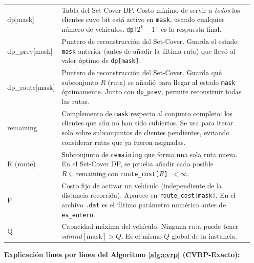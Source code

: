\documentclass[12pt,a4paper]{article}
\begin{document}
\begin{center}
\begin{tabular}{>{\ttfamily}lp{10cm}}
\addlinespace
dp[mask] & Tabla del Set-Cover DP. Costo mínimo de servir a \emph{todos} los clientes cuyo bit está activo en \texttt{mask}, usando cualquier número de vehículos. \texttt{dp[$2^k-1$]} es la respuesta final. \\
\addlinespace
dp\_prev[mask] & Puntero de reconstrucción del Set-Cover. Guarda el estado \texttt{mask} anterior (antes de añadir la última ruta) que llevó al valor óptimo de \texttt{dp[mask]}. \\
\addlinespace
dp\_route[mask] & Puntero de reconstrucción del Set-Cover. Guarda qué subconjunto $R$ (ruta) se añadió para llegar al estado \texttt{mask} óptimamente. Junto con \texttt{dp\_prev}, permite reconstruir todas las rutas. \\
\addlinespace
remaining & Complemento de \texttt{mask} respecto al conjunto completo: los clientes que aún no han sido cubiertos. Se usa para iterar solo sobre subconjuntos de clientes pendientes, evitando considerar rutas que ya fueron asignadas. \\
\addlinespace
R (route) & Subconjunto de \texttt{remaining} que forma una sola ruta nueva. En el Set-Cover DP, se prueba añadir cada posible $R \subseteq \text{remaining}$ con \texttt{route\_cost[$R$] $< \infty$}. \\
\addlinespace
F & Costo fijo de activar un vehículo (independiente de la distancia recorrida). Aparece en \texttt{route\_cost[mask]}. En el archivo \texttt{.dat} es el último parámetro numérico antes de \texttt{es\_entero}. \\
\addlinespace
Q & Capacidad máxima del vehículo. Ninguna ruta puede tener $sdmnd[\text{mask}] > Q$. Es el mismo $Q$ global de la instancia. \\
\bottomrule
\end{tabular}
\end{center}

\textbf{Explicación línea por línea del Algoritmo \ref{alg:cvrp} (CVRP-Exacto):}
\end{document}
